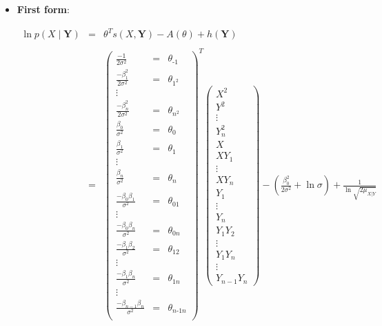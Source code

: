 \documentclass[11pt, oneside]{article}   	%
\numberwithin{figure}{section}
\numberwithin{equation}{section}
\numberwithin{table}{section}
\begin{document}
\begin{itemize}
\item \textbf{First form}:

\begin{eqnarray*}
\ln p(X \mid \mathbf{Y}) &=& \theta^T s(X,\mathbf{Y}) - A(\theta) + h(\mathbf{Y})\\\\
&=&
\begin{pmatrix}
\frac{-1}{2\sigma^2} &=& \theta_{\mbox{-}1} \\
\frac{-\beta_1^2}{2\sigma^2} &=& \theta_{1^2} \\
\vdots \\
\frac{-\beta_n^2}{2\sigma^2} &=& \theta_{n^2} \\
\frac{\beta_0}{\sigma^2} &=& \theta_0 \\
\frac{\beta_1}{\sigma^2} &=& \theta_1 \\
\vdots\\
\frac{\beta_n}{\sigma^2} &=& \theta_n \\\\
\frac{-\beta_0\beta_1}{\sigma^2} &=&\theta_{01} \\
\vdots\\
\frac{-\beta_0\beta_n}{\sigma^2} &=& \theta_{0n} \\
\frac{-\beta_1\beta_2}{\sigma^2} &=& \theta_{12} \\
\vdots\\
\frac{-\beta_1\beta_n}{\sigma^2} &=& \theta_{1n} \\
\vdots\\
\frac{-\beta_{n-1}\beta_n}{\sigma^2} &=&\theta_{n\mbox{-}1n} \\
\end{pmatrix}^T
\begin{pmatrix}
X^2\\
Y^2\\
\vdots\\
Y_n^2\\
X\\
XY_1\\
\vdots\\
XY_n\\
Y_1\\
\vdots\\
Y_n\\
Y_1Y_2\\
\vdots\\
Y_1Y_n\\
\vdots\\
Y_{n-1}Y_n
\end{pmatrix}
- \left( \frac{\beta_0^2}{2\sigma^2} + \ln{\sigma}\right) + \frac{1}{\ln{\sqrt{2\mu_{X|Y}}}}
\end{eqnarray*}


\end{itemize}
\end{document}
